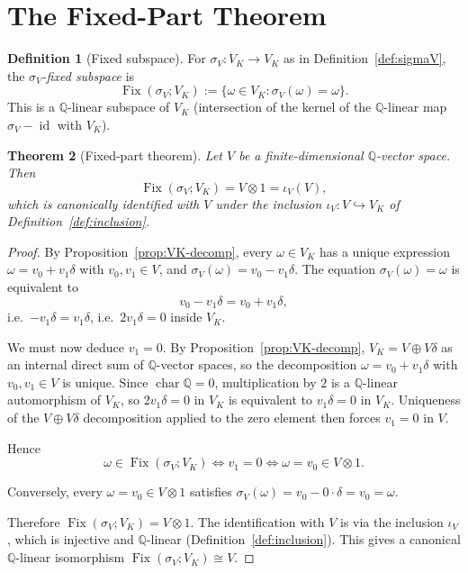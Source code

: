 \documentclass[11pt, a4paper]{amsart}
\newtheorem{theorem}{Theorem}[section]
\theoremstyle{definition}
\newtheorem{definition}[theorem]{Definition}
\newcommand{\Q}{\mathbb{Q}}
\newcommand{\Fix}{\operatorname{Fix}}
\newcommand{\id}{\operatorname{id}}
\begin{document}
\section{The Fixed-Part Theorem}
\label{sec:fixed-part}

\begin{definition}[Fixed subspace]
\label{def:fix}
For $\sigma_V \colon V_K \to V_K$ as in Definition~\ref{def:sigmaV},
the \emph{$\sigma_V$-fixed subspace} is
\[
  \Fix(\sigma_V; V_K) := \{\omega \in V_K : \sigma_V(\omega) = \omega\}.
\]
This is a $\Q$-linear subspace of $V_K$ (intersection of the
kernel of the $\Q$-linear map $\sigma_V - \id$ with $V_K$).
\end{definition}

\begin{theorem}[Fixed-part theorem]
\label{thm:fixed-part}
Let $V$ be a finite-dimensional $\Q$-vector space. Then
\[
  \Fix(\sigma_V; V_K) = V \otimes 1 = \iota_V(V),
\]
which is canonically identified with $V$ under the inclusion
$\iota_V \colon V \hookrightarrow V_K$ of
Definition~\ref{def:inclusion}.
\end{theorem}

\begin{proof}
By Proposition~\ref{prop:VK-decomp}, every $\omega \in V_K$ has a
unique expression $\omega = v_0 + v_1 \delta$ with $v_0, v_1 \in V$,
and $\sigma_V(\omega) = v_0 - v_1 \delta$. The equation
$\sigma_V(\omega) = \omega$ is equivalent to
\[
  v_0 - v_1 \delta = v_0 + v_1 \delta,
\]
i.e.\ $-v_1 \delta = v_1 \delta$, i.e.\ $2 v_1 \delta = 0$ inside
$V_K$.

We must now deduce $v_1 = 0$. By
Proposition~\ref{prop:VK-decomp}, $V_K = V \oplus V\delta$ as an
internal direct sum of $\Q$-vector spaces, so the decomposition
$\omega = v_0 + v_1\delta$ with $v_0, v_1 \in V$ is unique. Since
$\operatorname{char} \Q = 0$, multiplication by $2$ is a $\Q$-linear
automorphism of $V_K$, so $2 v_1 \delta = 0$ in $V_K$ is equivalent
to $v_1 \delta = 0$ in $V_K$. Uniqueness of the $V \oplus V\delta$
decomposition applied to the zero element then forces $v_1 = 0$ in
$V$.

Hence
\[
  \omega \in \Fix(\sigma_V; V_K) \iff v_1 = 0 \iff \omega = v_0 \in V \otimes 1.
\]

Conversely, every $\omega = v_0 \in V \otimes 1$ satisfies
$\sigma_V(\omega) = v_0 - 0 \cdot \delta = v_0 = \omega$.

Therefore $\Fix(\sigma_V; V_K) = V \otimes 1$. The identification
with $V$ is via the inclusion $\iota_V$, which is injective and
$\Q$-linear (Definition~\ref{def:inclusion}). This gives a
canonical $\Q$-linear isomorphism $\Fix(\sigma_V; V_K) \cong V$.
\end{proof}
\end{document}
